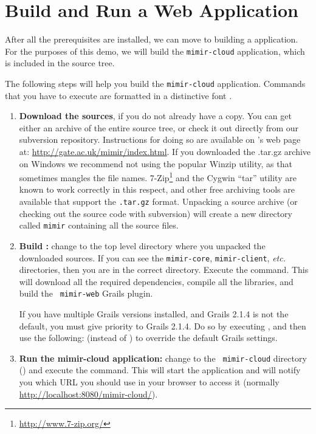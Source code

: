 \section{Build and Run a \Mimir{} Web Application}
%
After all the prerequisites are installed, we can move to building a \Mimir{}
application. For the purposes of this demo, we will build the {\tt mimir-cloud}
application, which is included in the source tree.

The following steps will help you build the {\tt mimir-cloud} application.
Commands that you have to execute are formatted in a distinctive font
.
\begin{enumerate}
  \item {\bf Download the \Mimir{} sources}, if you do not already have a copy.
  You can get either an archive of the entire source tree, or check it out
  directly from our subversion repository. Instructions for doing so are
  available on \Mimir{}'s web page at:
  \url{http://gate.ac.uk/mimir/index.html}.
  If you downloaded the .tar.gz archive on Windows we recommend not using the
  popular Winzip utility, as that sometimes mangles the file names. 
  7-Zip\footnote{\url{http://www.7-zip.org/}} and the Cygwin ``tar'' utility are
  known to work correctly in this respect, and other free archiving tools are 
  available that support the {\tt .tar.gz} format.
  Unpacking a source archive (or checking out the source code with subversion)
  will create a new directory called {\tt mimir} containing all the source
  files.
  \item {\bf Build \Mimir{}:} change to the top level directory where you
  unpacked the downloaded \Mimir{} sources. If you can see the {\tt mimir-core},
  {\tt mimir-client}, {\em etc.} directories, then you are in the correct
  directory. Execute the  command. This will download all the
  required dependencies, compile all the \Mimir{} libraries, and build the {\tt
  mimir-web} Grails plugin.
  
  If you have multiple Grails versions installed, and Grails 2.1.4 is not the
  default, you must give priority to Grails 2.1.4.  Do so by executing
  , and then use the following:
   (instead of ) to
  override the default Grails settings.
  \item {\bf Run the mimir-cloud application:}  change to the {\tt
  mimir-cloud} directory () and execute the  command. This will start the application and will notify you which
  URL you should use in your browser to access it (normally
  \url{http://localhost:8080/mimir-cloud/}).
\end{enumerate}
%

